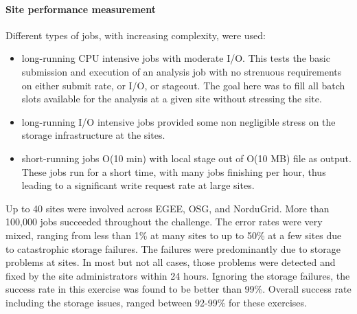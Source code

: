 \paragraph{Site performance measurement}
Different types of jobs, with increasing complexity, were used:
\begin{itemize}
\item long-running CPU intensive jobs with moderate I/O. This tests the basic submission and execution of an analysis job with no strenuous requirements on 
either submit rate, or I/O, or stageout. The goal here was to fill all batch slots available for the analysis at a given site without stressing the site.
\item long-running I/O intensive jobs provided some non negligible stress on 
the storage infrastructure at the sites.
\item short-running jobs O(10 min) with local stage out of O(10 MB) file as output. These jobs run for a short time, with many jobs finishing per hour, thus leading to a significant write request rate at large sites.
\end{itemize}
Up to 40 sites were involved across EGEE, OSG, and NorduGrid. More than 100,000 jobs succeeded throughout the challenge. The error rates were very mixed, ranging from less than 1\% at many sites to up to 50\% at a few sites due to
catastrophic storage failures. The failures were predominantly
due to storage problems at sites. In most but not all cases, those problems were detected and fixed by the site administrators within 24 hours. Ignoring the storage failures, the success rate in this exercise was found to be better than 99\%. Overall success rate including the storage issues, ranged between 92-99\% for these exercises.

